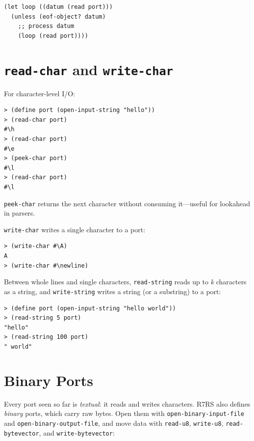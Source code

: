\begin{lstlisting}
(let loop ((datum (read port)))
  (unless (eof-object? datum)
    ;; process datum
    (loop (read port))))
\end{lstlisting}

\section{\texttt{read-char} and \texttt{write-char}}

For character-level I/O:

\begin{lstlisting}[style=repl]
> (define port (open-input-string "hello"))
> (read-char port)
#\h
> (read-char port)
#\e
> (peek-char port)
#\l
> (read-char port)
#\l
\end{lstlisting}

\texttt{peek-char} returns the next character without consuming it---useful for lookahead in parsers.

\texttt{write-char} writes a single character to a port:

\begin{lstlisting}[style=repl]
> (write-char #\A)
A
> (write-char #\newline)

\end{lstlisting}

Between whole lines and single characters,
\texttt{read-string} reads up to
\emph{k} characters as a string, and
\texttt{write-string} writes a
string (or a substring) to a port:

\begin{lstlisting}[style=repl]
> (define port (open-input-string "hello world"))
> (read-string 5 port)
"hello"
> (read-string 100 port)
" world"
\end{lstlisting}

\section{Binary Ports}

Every port seen so far is \emph{textual}: it reads and writes characters. R7RS also defines \emph{binary} ports, which carry raw bytes. Open them with \texttt{open-binary-input-file} and \texttt{open-binary-output-file}, and move data with \texttt{read-u8}, \texttt{write-u8}, \texttt{read-bytevector}, and \texttt{write-bytevector}:

